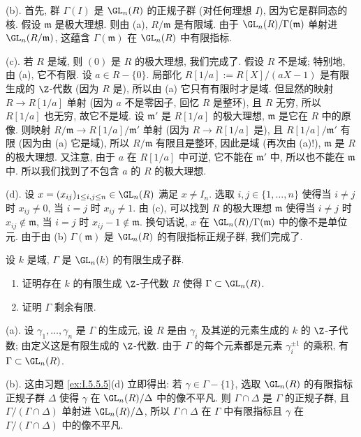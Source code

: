 \begin{solution}
(b). 首先, 群 $\Gamma(I)$ 是 $\GL_n(R)$ 的正规子群 (对任何理想 $I$), 因为它是群同态的核. 假设 $\mathfrak{m}$ 是极大理想. 则由 (a), $R/\mathfrak{m}$ 是有限域. 由于 $\GL_n(R)/\Gamma(\mathfrak{m})$ 单射进 $\GL_n(R/\mathfrak{m})$, 这蕴含 $\Gamma(\mathfrak{m})$ 在 $\GL_n(R)$ 中有限指标.

(c). 若 $R$ 是域, 则 $(0)$ 是 $R$ 的极大理想, 我们完成了. 假设 $R$ 不是域; 特别地, 由 (a), 它不有限. 设 $a \in R - \{0\}$. 局部化 $R[1/a] := R[X]/(aX - 1)$ 是有限生成的 $\Z$-代数 (因为 $R$ 是), 所以由 (a) 它只有有限时才是域. 但显然的映射 $R \to R[1/a]$ 单射 (因为 $a$ 不是零因子, 回忆 $R$ 是整环), 且 $R$ 无穷, 所以 $R[1/a]$ 也无穷, 故它不是域. 设 $\mathfrak{m}'$ 是 $R[1/a]$ 的极大理想, $\mathfrak{m}$ 是它在 $R$ 中的原像. 则映射 $R/\mathfrak{m} \to R[1/a]/\mathfrak{m}'$ 单射 (因为 $R \to R[1/a]$ 是), 且 $R[1/a]/\mathfrak{m}'$ 有限 (因为由 (a) 它是域), 所以 $R/\mathfrak{m}$ 有限且是整环, 因此是域 (再次由 (a)!), $\mathfrak{m}$ 是 $R$ 的极大理想. 又注意, 由于 $a$ 在 $R[1/a]$ 中可逆, 它不能在 $\mathfrak{m}'$ 中, 所以也不能在 $\mathfrak{m}$ 中. 所以我们找到了不包含 $a$ 的 $R$ 的极大理想.

(d). 设 $x = (x_{ij})_{1 \leq i,j \leq n} \in \GL_n(R)$ 满足 $x \neq I_n$. 选取 $i, j \in \{1, \ldots, n\}$ 使得当 $i \neq j$ 时 $x_{ij} \neq 0$, 当 $i = j$ 时 $x_{ij} \neq 1$. 由 (c), 可以找到 $R$ 的极大理想 $\mathfrak{m}$ 使得当 $i \neq j$ 时 $x_{ij} \notin \mathfrak{m}$, 当 $i = j$ 时 $x_{ij} - 1 \notin \mathfrak{m}$. 换句话说, $x$ 在 $\GL_n(R)/\Gamma(\mathfrak{m})$ 中的像不是单位元. 由于由 (b) $\Gamma(\mathfrak{m})$ 是 $\GL_n(R)$ 的有限指标正规子群, 我们完成了.
\end{solution}

\begin{exercise}[有限生成子群剩余有限]
\label{ex:I.5.5.6}
设 $k$ 是域, $\Gamma$ 是 $\GL_n(k)$ 的有限生成子群.
\begin{enumerate}
\item[(a)] 证明存在 $k$ 的有限生成 $\Z$-子代数 $R$ 使得 $\Gamma \subset \GL_n(R)$.
\item[(b)] 证明 $\Gamma$ 剩余有限.
\end{enumerate}
\end{exercise}

\begin{solution}
(a). 设 $\gamma_1, \ldots, \gamma_n$ 是 $\Gamma$ 的生成元, 设 $R$ 是由 $\gamma_i$ 及其逆的元素生成的 $k$ 的 $\Z$-子代数; 由定义这是有限生成的 $\Z$-代数. 由于 $\Gamma$ 的每个元素都是元素 $\gamma_i^{\pm 1}$ 的乘积, 有 $\Gamma \subset \GL_n(R)$.

(b). 这由习题 \ref{ex:I.5.5.5}(d) 立即得出: 若 $\gamma \in \Gamma - \{1\}$, 选取 $\GL_n(R)$ 的有限指标正规子群 $\Delta$ 使得 $\gamma$ 在 $\GL_n(R)/\Delta$ 中的像不平凡. 则 $\Gamma \cap \Delta$ 是 $\Gamma$ 的正规子群, 且 $\Gamma/(\Gamma \cap \Delta)$ 单射进 $\GL_n(R)/\Delta$, 所以 $\Gamma \cap \Delta$ 在 $\Gamma$ 中有限指标且 $\gamma$ 在 $\Gamma/(\Gamma \cap \Delta)$ 中的像不平凡.
\end{solution}

